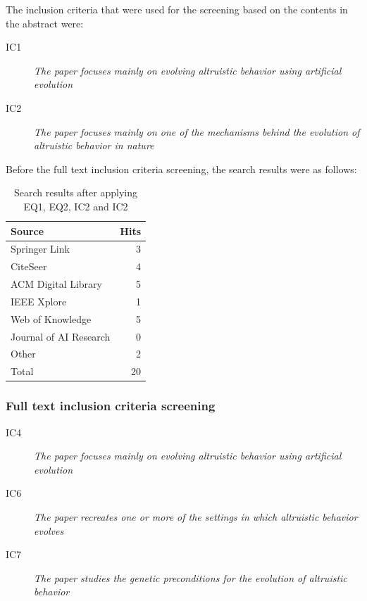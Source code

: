 \documentclass[a4paper]{book}
\begin{document}
\begin{appendices}
				The inclusion criteria that were used for the screening based on the contents in the abstract were:

				\begin{description}
				\item[IC1] {\it The paper focuses mainly on evolving altruistic behavior using artificial evolution}
				\item[IC2] {\it The paper focuses mainly on one of the mechanisms behind the evolution of altruistic behavior in nature}
				\end{description}

				Before the full text inclusion criteria screening, the search results were as follows:
				\begin{table}[htdp]
				\begin{center}
				\begin{tabular}{|l|r|}
				\hline
				Source				& Hits 	\\ \hline
				Springer Link 			& 3 	\\ \hline
				CiteSeer    			& 4 \\ \hline
				ACM Digital Library 		& 5 \\ \hline
				IEEE Xplore 			& 1  \\ \hline
				Web of Knowledge 		& 5 \\ \hline
				Journal of AI Research 		& 0 	\\ \hline
				Other  				& 2 \\ \hline \hline
				Total				& 20 \\\hline\hline
				\end{tabular}
				\end{center}
				\label{table:SearchResults}
				\caption{Search results after applying EQ1, EQ2, IC2 and IC2}
				\end{table}
				\subsubsection{Full text inclusion criteria screening}

				\begin{description}
				\item[IC4] {\it The paper focuses mainly on evolving altruistic behavior using artificial evolution}
				\item[IC6] {\it The paper recreates one or more of the settings in which altruistic behavior evolves}
				\item[IC7] {\it The paper studies the genetic preconditions for the evolution of altruistic behavior}
				\end{description}


\end{appendices}
\end{document}
